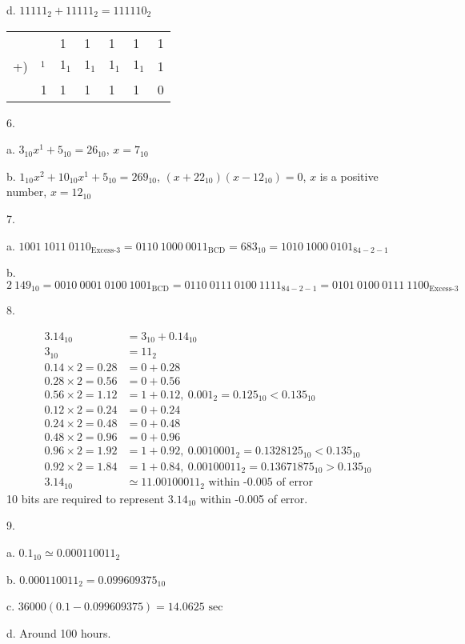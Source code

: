 \documentclass[UTF8,12pt,letterpaper,oneside]{amsart}
\begin{document}
d. $11111_2 + 11111_2 = 111110_2$

\begin{tabular}{lllllll}
   &   & 1 & 1      & 1   & 1 & 1\\
+) & ${}_1$  & $1_1$ & $1_1$  & $1_1$ & $1_1$ & 1\\\hline
   & 1 & 1 & 1      & 1   & 1 & 0
\end{tabular}

6.

a. $3_{10} x^1 + 5_{10} = 26_{10}$, $x = 7_{10}$

b. $1_{10} x^2 + 10_{10} x^1 + 5_{10} = 269_{10}$, $(x + 22_{10})(x - 12_{10}) = 0$, $x$ is a positive number, $x = 12_{10}$

7.

a. $1001\ 1011\ 0110_{\text{Excess-3}} = 0110\ 1000\ 0011_{\text{BCD}} = 683_{10} = 1010\ 1000\ 0101_{84-2-1}$

b. $2\ 149_{10} = 0010\ 0001\ 0100\ 1001_{\text{BCD}} = 0110\ 0111\ 0100\ 1111_{84-2-1} = 0101\ 0100\ 0111\ 1100_{\text{Excess-3}}$

8.

\begin{equation*}\begin{split}
3.14_{10}   &= 3_{10} + 0.14_{10}\\
3_{10} &= 11_2\\
0.14 \times 2 = 0.28 &= 0 + 0.28\\
0.28 \times 2 = 0.56 &= 0 + 0.56\\
0.56 \times 2 = 1.12 &= 1 + 0.12,\ 0.001_2 = 0.125_{10} < 0.135_{10}\\
0.12 \times 2 = 0.24 &= 0 + 0.24\\
0.24 \times 2 = 0.48 &= 0 + 0.48\\
0.48 \times 2 = 0.96 &= 0 + 0.96\\
0.96 \times 2 = 1.92 &= 1 + 0.92,\ 0.0010001_2 = 0.1328125_{10} < 0.135_{10}\\
0.92 \times 2 = 1.84 &= 1 + 0.84,\ 0.00100011_2 = 0.13671875_{10} > 0.135_{10}\\
3.14_{10} &\simeq 11.00100011_2\text{ within -0.005 of error}
\end{split}\end{equation*}
10 bits are required to represent $3.14_{10}$ within -0.005 of error.

9.

a. $0.1_{10} \simeq 0.000110011_2$

b. $0.000110011_2 = 0.099609375_{10}$

c. $36000(0.1 - 0.099609375) = 14.0625\text{ sec}$

d. Around 100 hours.
\end{document}
